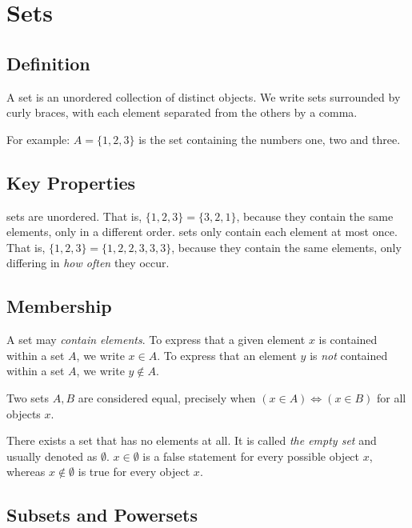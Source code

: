 \chapter{Sets}\label{ch:sets}
\section{Definition}
\begin{definition}
  A set is an unordered collection of distinct objects.
  We write sets surrounded by curly braces, with each element
  separated from the others by a comma.
\end{definition}
\begin{example}
  [A set]
  For example: \(A = \{1, 2, 3\}\) is the set
  containing the numbers one, two and three.
\end{example}

\section{Key Properties}
\begin{itemize}
   sets are unordered. That is, \(\{1,2,3\}=\{3,2,1\}\),
  because they contain the same elements, only in a different order.
   sets only contain each element at most once.
  That is, \(\{1,2,3\}=\{1,2,2,3,3,3\}\), because they contain the same
  elements, only differing in \emph{how often} they occur.
\end{itemize}

\section{Membership}
A set may \emph{contain elements}.
To express that a given element \(x\) is contained within a set \(A\),
we write \(x \in A\). To express that an element \(y\) is \emph{not} contained
within a set \(A\), we write \(y \notin A\).

Two sets \(A, B\) are considered equal, precisely when
\((x \in A) \Leftrightarrow (x \in B)\) for all objects \(x\).

There exists a set that has no elements at all. It is called \emph{the empty
  set} and usually denoted as \(\emptyset\).
\(x \in \emptyset\) is a false statement for every possible object \(x\),
whereas \(x \notin \emptyset\) is true for every object \(x\).

\section{Subsets and Powersets}

